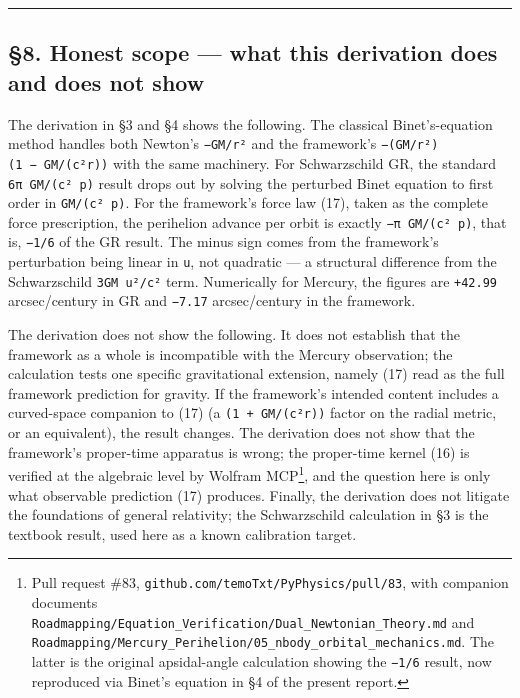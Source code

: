 \documentclass[
  11pt,
]{article}
\begin{document}
\begin{center}\rule{0.5\linewidth}{0.5pt}\end{center}

\hypertarget{honest-scope-what-this-derivation-does-and-does-not-show}{%
\subsection{§8. Honest scope --- what this derivation does and does not
show}\label{honest-scope-what-this-derivation-does-and-does-not-show}}

The derivation in §3 and §4 shows the following. The classical
Binet's-equation method handles both Newton's \texttt{−GM/r²} and the
framework's \texttt{−(GM/r²)(1\ −\ GM/(c²r))} with the same machinery.
For Schwarzschild GR, the standard \texttt{6π\ GM/(c²\ p)} result drops
out by solving the perturbed Binet equation to first order in
\texttt{GM/(c²\ p)}. For the framework's force law (17), taken as the
complete force prescription, the perihelion advance per orbit is exactly
\texttt{−π\ GM/(c²\ p)}, that is, \texttt{−1/6} of the GR result. The
minus sign comes from the framework's perturbation being linear in
\texttt{u}, not quadratic --- a structural difference from the
Schwarzschild \texttt{3GM\ u²/c²} term. Numerically for Mercury, the
figures are \texttt{+42.99} arcsec/century in GR and \texttt{−7.17}
arcsec/century in the framework.

The derivation does not show the following. It does not establish that
the framework as a whole is incompatible with the Mercury observation;
the calculation tests one specific gravitational extension, namely (17)
read as the full framework prediction for gravity. If the framework's
intended content includes a curved-space companion to (17) (a
\texttt{(1\ +\ GM/(c²r))} factor on the radial metric, or an
equivalent), the result changes. The derivation does not show that the
framework's proper-time apparatus is wrong; the proper-time kernel (16)
is verified at the algebraic level by Wolfram MCP\footnote{Pull request
  \#83, \texttt{github.com/temoTxt/PyPhysics/pull/83}, with companion
  documents
  \texttt{Roadmapping/Equation\_Verification/Dual\_Newtonian\_Theory.md}
  and
  \texttt{Roadmapping/Mercury\_Perihelion/05\_nbody\_orbital\_mechanics.md}.
  The latter is the original apsidal-angle calculation showing the
  \texttt{−1/6} result, now reproduced via Binet's equation in §4 of the
  present report.}, and the question here is only what observable
prediction (17) produces. Finally, the derivation does not litigate the
foundations of general relativity; the Schwarzschild calculation in §3
is the textbook result, used here as a known calibration target.
\end{document}
